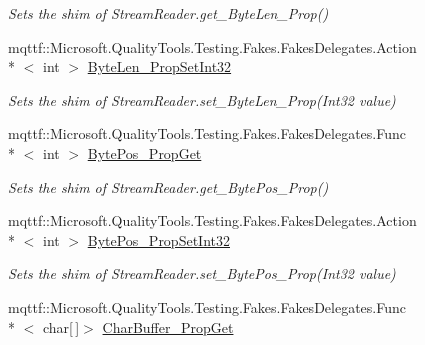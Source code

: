 \begin{DoxyCompactItemize}
\begin{DoxyCompactList}\small\item\em Sets the shim of Stream\-Reader.\-get\-\_\-\-Byte\-Len\-\_\-\-Prop()\end{DoxyCompactList}\item 
mqttf\-::\-Microsoft.\-Quality\-Tools.\-Testing.\-Fakes.\-Fakes\-Delegates.\-Action\\*
$<$ int $>$ \hyperlink{class_system_1_1_i_o_1_1_fakes_1_1_shim_stream_reader_a7ad8bf24cc99246cef65c34e477541d0}{Byte\-Len\-\_\-\-Prop\-Set\-Int32}
\begin{DoxyCompactList}\small\item\em Sets the shim of Stream\-Reader.\-set\-\_\-\-Byte\-Len\-\_\-\-Prop(\-Int32 value)\end{DoxyCompactList}\item 
mqttf\-::\-Microsoft.\-Quality\-Tools.\-Testing.\-Fakes.\-Fakes\-Delegates.\-Func\\*
$<$ int $>$ \hyperlink{class_system_1_1_i_o_1_1_fakes_1_1_shim_stream_reader_a0ea9d8b60fd615d78d46492aebc0eada}{Byte\-Pos\-\_\-\-Prop\-Get}
\begin{DoxyCompactList}\small\item\em Sets the shim of Stream\-Reader.\-get\-\_\-\-Byte\-Pos\-\_\-\-Prop()\end{DoxyCompactList}\item 
mqttf\-::\-Microsoft.\-Quality\-Tools.\-Testing.\-Fakes.\-Fakes\-Delegates.\-Action\\*
$<$ int $>$ \hyperlink{class_system_1_1_i_o_1_1_fakes_1_1_shim_stream_reader_a2d19237eb743e68c0abbdaf4b08c1e1a}{Byte\-Pos\-\_\-\-Prop\-Set\-Int32}
\begin{DoxyCompactList}\small\item\em Sets the shim of Stream\-Reader.\-set\-\_\-\-Byte\-Pos\-\_\-\-Prop(\-Int32 value)\end{DoxyCompactList}\item 
mqttf\-::\-Microsoft.\-Quality\-Tools.\-Testing.\-Fakes.\-Fakes\-Delegates.\-Func\\*
$<$ char\mbox{[}$\,$\mbox{]}$>$ \hyperlink{class_system_1_1_i_o_1_1_fakes_1_1_shim_stream_reader_a3953275952a84af867fcd0c9521e3612}{Char\-Buffer\-\_\-\-Prop\-Get}

\end{DoxyCompactItemize}

